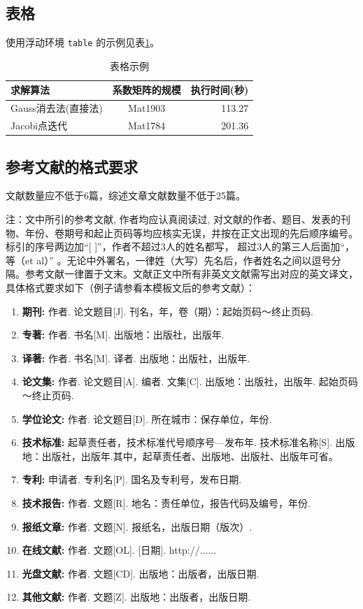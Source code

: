 \documentclass[UTF8]{csoarticle}
\begin{document}
\subsection{表格}

使用浮动环境 \verb|table| 的示例见表\ref{tab:sample}。
\begin{table}
  \caption{表格示例}
  \label{tab:sample}
  \centering
  \begin{tabular}{lcr}%
    \hline
    求解算法                & 系数矩阵的规模    & 执行时间(秒)  \\
    \hline
    Gauss消去法(直接法)     & Mat1903           &  113.27       \\
    Jacobi点迭代            & Mat1784           &  201.36       \\
    \hline
  \end{tabular}
\end{table}


\subsection{参考文献的格式要求}

文献数量应不低于6篇，综述文章文献数量不低于25篇。

注：文中所引的参考文献, 作者均应认真阅读过, 对文献的作者、题目、发表的刊物、年份、卷期号和起止页码等均应核实无误，并按在正文出现的先后顺序编号。标引的序号两边加“[ ]”，作者不超过3人的姓名都写， 超过3人的第三人后面加“，等（et al）” 。无论中外署名，一律姓（大写）先名后，作者姓名之间以逗号分隔。参考文献一律置于文末。文献正文中所有非英文文献需写出对应的英文译文，具体格式要求如下（例子请参看本模板文后的参考文献）：
\begin{enumerate}
\item\textbf{期刊:}     作者. 论文题目[J]. 刊名，年，卷（期）：起始页码～终止页码.
\item\textbf{专著:}     作者. 书名[M]. 出版地：出版社，出版年.
\item\textbf{译著:}     作者. 书名[M]. 译者. 出版地：出版社，出版年.
\item\textbf{论文集:}   作者. 论文题目[A]. 编者. 文集[C]. 出版地：出版社，出版年. 起始页码～终止页码.
\item\textbf{学位论文:} 作者. 论文题目[D]. 所在城市：保存单位，年份.
\item\textbf{技术标准:} 起草责任者，技术标准代号顺序号—发布年. 技术标准名称[S]. 出版地：出版社，出版年.其中，起草责任者、出版地、出版社、出版年可省。
\item\textbf{专利:}     申请者. 专利名[P]. 国名及专利号，发布日期.
\item\textbf{技术报告:} 作者. 文题[R]. 地名：责任单位，报告代码及编号，年份.
\item\textbf{报纸文章:} 作者. 文题[N]. 报纸名，出版日期（版次）.
\item\textbf{在线文献:} 作者. 文题[OL]. [日期]. http://......
\item\textbf{光盘文献:} 作者. 文题[CD]. 出版地：出版者，出版日期.
\item\textbf{其他文献:} 作者. 文题[Z]. 出版地：出版者，出版日期.
\end{enumerate}
\end{document}
